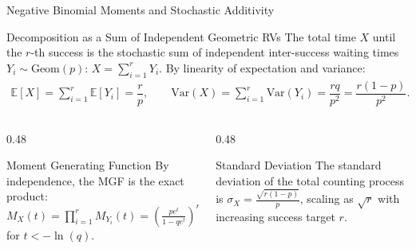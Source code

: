 \documentclass[aspectratio=169,xcolor={dvipsnames,table}]{beamer}
\begin{document}
\begin{frame}{Negative Binomial Moments and Stochastic Additivity}
	\begin{block}{Decomposition as a Sum of Independent Geometric RVs}
		\small
		The total time $X$ until the $r$-th success is the stochastic sum of independent inter-success waiting times $Y_i \sim \text{Geom}(p)$: $X = \sum_{i=1}^r Y_i$. By linearity of expectation and variance:
		\begin{align*}
			\mathbb{E}[X] = \sum_{i=1}^r \mathbb{E}[Y_i] = \dfrac{r}{p}, \qquad \text{Var}(X) = \sum_{i=1}^r \text{Var}(Y_i) = \dfrac{rq}{p^2} = \dfrac{r(1-p)}{p^2}.
		\end{align*}
	\end{block}
	\vspace{-0.15cm}
	\begin{columns}[T]
		\begin{column}{0.48\textwidth}
			\begin{exampleblock}{Moment Generating Function}
				\footnotesize
				By independence, the MGF is the exact product:
				$M_X(t) = \prod_{i=1}^r M_{Y_i}(t) = \left(\frac{pe^t}{1-qe^t}\right)^r$ for $t < -\ln(q)$.
			\end{exampleblock}
		\end{column}
		\begin{column}{0.48\textwidth}
			\begin{alertblock}{Standard Deviation}
				\footnotesize
				The standard deviation of the total counting process is $\sigma_X = \frac{\sqrt{r(1-p)}}{p}$, scaling as $\sqrt{r}$ with increasing success target $r$.
			\end{alertblock}
		\end{column}
	\end{columns}
\end{frame}
\end{document}
